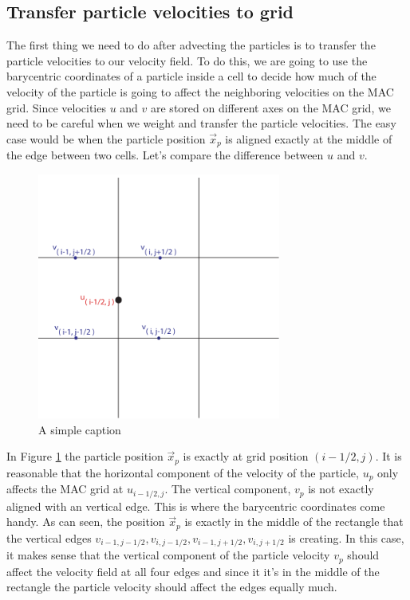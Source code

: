 \subsection{Transfer particle velocities to grid}

The first thing we need to do after advecting the particles is to transfer the particle velocities to our velocity field. To do this, we are going to use the barycentric coordinates of a particle inside a cell to decide how much of the velocity of the particle is going to affect the neighboring velocities on the MAC grid. Since velocities $u$ and $v$ are stored on different axes on the MAC grid, we need to be careful when we weight and transfer the particle velocities. The easy case would be when the particle position $\vec{x}_p$ is aligned exactly at the middle of the edge between two cells. Let's compare the difference between $u$ and $v$. 

\begin{figure}[ht!]
\centering
\includegraphics[width=80mm]{img/transfer1.pdf}
\caption{A simple caption}
\label{onedge}
\end{figure}

In Figure \ref{onedge} the particle position $\vec{x}_p$ is exactly at grid position $(i-1/2,j)$. It is reasonable that the horizontal component of the velocity of the particle, $u_p$ only affects the MAC grid at $u_{i-1/2,j}$. The vertical component, $v_p$ is not exactly aligned with an vertical edge. This is where the barycentric coordinates come handy. As can seen, the position $\vec{x}_p$ is exactly in the middle of the rectangle that the vertical edges $v_{i-1,j-1/2}, v_{i,j-1/2}, v_{i-1,j+1/2}, v_{i,j+1/2} $ is creating. In this case, it makes sense that the vertical component of the particle velocity $v_p$ should affect the velocity field at all four edges and since it it's in the middle of the rectangle the particle velocity should affect the edges equally much.

